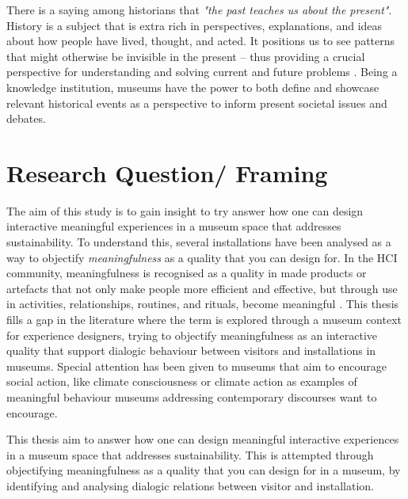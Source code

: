 There is a saying among historians that \emph{"the past teaches us about the present"}. History is a subject that is extra rich in perspectives, explanations, and ideas about how people have lived, thought, and acted. It positions us to see patterns that might otherwise be invisible in the present – thus providing a crucial perspective for understanding and solving current and future problems \autocite{UW_website}. Being a knowledge institution, museums have the power to both define and showcase relevant historical events as a perspective to inform present societal issues and debates. 




\section{Research Question/ Framing}
The aim of this study is to gain insight to try answer how one can design interactive meaningful experiences in a museum space that addresses sustainability. To understand this, several installations have been analysed as a way to objectify \emph{meaningfulness} as a quality that you can design for. In the HCI community, meaningfulness is recognised as a quality in made products or artefacts that not only make people more efficient and effective, but through use in activities, relationships, routines, and rituals, become meaningful \autocite{zimmerman_designing_2009}. This thesis fills a gap in the literature where the term is explored through a museum context for experience designers, trying to objectify meaningfulness as an interactive quality that support dialogic behaviour between visitors and installations in museums. Special attention has been given to museums that aim to encourage social action, like climate consciousness or climate action as examples of meaningful behaviour museums addressing contemporary discourses want to encourage.

This thesis aim to answer how one can design meaningful interactive experiences in a museum space that addresses sustainability. This is attempted through objectifying meaningfulness as a quality that you can design for in a museum, by identifying and analysing dialogic relations between visitor and installation.

